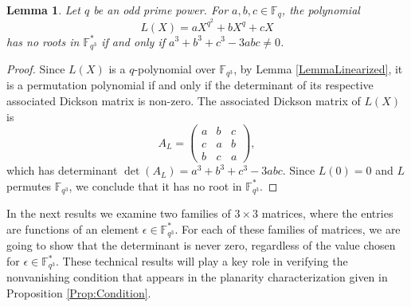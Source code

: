 \documentclass[12pt]{amsart}
\newtheorem{lemma}[theorem]{Lemma}
\begin{document}
\begin{lemma} \label{Lemma_L}
	Let $q$ be an odd prime power. For $a, b, c \in \mathbb{F}_q$, the polynomial 
$$L(X) = aX^{q^2} + bX^q+cX$$ has no roots in $\mathbb{F}_{q^3}^*$ if and only if $a^3+b^3+c^3-3abc \neq 0$.
\end{lemma}
\begin{proof}
Since  $L(X)$ is a $q$-polynomial over $\mathbb{F}_{q^3}$, by Lemma \ref{LemmaLinearized}, it is a permutation polynomial if and only if the determinant of its respective associated Dickson matrix is non-zero.
 The associated Dickson matrix of $L(X)$ is
$$
A_{L} = \begin{pmatrix}
	a& b & c\\
	c & a & b\\
	b & c & a
\end{pmatrix},
$$
which has determinant $\det(A_{L}) = a^3+b^3+c^3-3abc$.
Since $L(0)=0$ and $L$ permutes $\mathbb{F}_{q^3}$, we conclude that it has no root in $\mathbb{F}_{q^3}^*$.
\end{proof}

In the next  results 
we examine two families of $3 \times 3$ matrices, where the entries are functions of an element $\epsilon \in \mathbb{F}_{q^3}^*$. For each of these families of matrices, we are going to show that the determinant is never zero, regardless of the value chosen for $\epsilon \in \mathbb{F}_{q^3}^*$. These technical results will play a key role in verifying the nonvanishing condition that appears in the planarity characterization given in Proposition \ref{Prop:Condition}.
\end{document}
